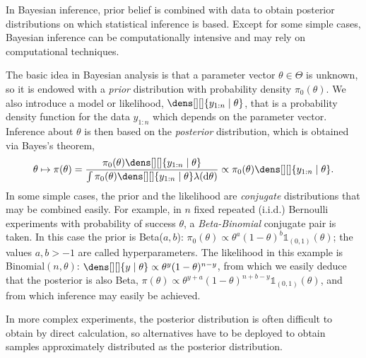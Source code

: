 \documentclass[english,graybox,envcountchap,envcountsame,sectrefs,shortlabels]{svmono}
\theoremstyle{style}
\begin{document}
\begin{example}
In  Bayesian inference, prior belief  is combined with
data to obtain posterior distributions on which statistical inference is based.
Except for some simple cases, Bayesian inference can be computationally
intensive and may rely on  computational techniques.


The basic idea in Bayesian analysis is that a parameter vector $ \theta \in \Theta$ is unknown, so it is endowed with a \emph{prior} distribution with probability density
$\pi_0( \theta)$.  We also
introduce a model or likelihood, $\dens[][]{ y_{1:n} \mid \theta}$, that is
a probability density function for the data $y_{1:n}$ which depends on the parameter vector.
Inference about $ \theta$ is then based on the \emph{posterior}
distribution, which is obtained via Bayes's theorem,
$$
\theta \mapsto \pi(\theta) =\frac{\pi_0( \theta) \dens[][]{ y_{1:n} \mid \theta}}{\int \pi_0( \theta) \dens[][]{ y_{1:n} \mid \theta} \lambda(\rmd \theta)} \propto \pi_0( \theta) \dens[][]{ y_{1:n} \mid \theta}.
$$
  In some simple cases, the prior  and
the likelihood are \emph{conjugate}  distributions that may be combined easily.
For example, in $n$ fixed repeated (i.i.d.) Bernoulli experiments with probability of success $\theta$,
a \emph{Beta-Binomial} conjugate pair is taken.  In this case the prior is
Beta($a,b$):
$\pi_0(\theta) \propto \theta^{a} (1-\theta)^{b}\mathds{1}_{(0,1)}(\theta)$; the values $a,b > -1$  are called
hyperparameters. The likelihood in this example is
Binomial$(n,\theta)$:
$\dens[][]{ y \mid \theta} \propto \theta^y (1-\theta)^{n-y}$, from which
we easily deduce that the
posterior is also Beta,
$\pi ( \theta ) \propto \theta^{y+a}(1-\theta)^{n+b-y }\mathds{1}_{(0,1)}(\theta)
$, and from which inference may easily be achieved.

In more complex experiments, the posterior distribution is often difficult to obtain by direct calculation,
so alternatives have to be deployed to obtain samples approximately distributed as the posterior distribution. 
\end{example}
\end{document}
